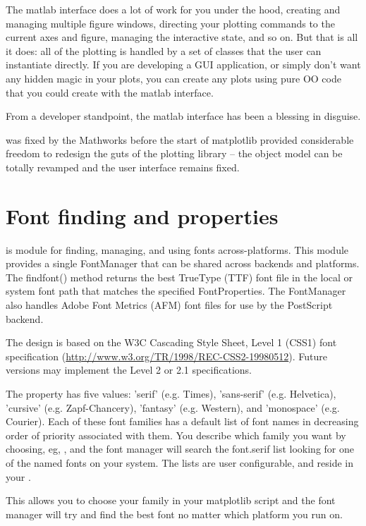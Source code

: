 \documentclass[twoside]{book}
\begin{document}
The matlab interface does a lot of work for you under the hood,
creating and managing multiple figure windows, directing your plotting
commands to the current axes and figure, managing the interactive
state, and so on.  But that is all it does: all of the plotting is
handled by a set of classes that the user can instantiate directly.
If you are developing a GUI application, or simply don't want any
hidden magic in your plots, you can create any plots using pure OO
code that you could create with the matlab interface.

From a developer standpoint, the matlab interface has been a blessing
in disguise.  

was fixed by the Mathworks before the start of matplotlib provided
considerable freedom to redesign the guts of the plotting library --
the object model can be totally revamped and the user interface
remains fixed.


\chapter{Font finding and properties}
\label{cha:font_finding}

 is module for finding,
managing, and using fonts across-platforms.  This module provides a
single FontManager that can be shared across backends and platforms.
The findfont() method returns the best TrueType (TTF) font file in the
local or system font path that matches the specified FontProperties.
The FontManager also handles Adobe Font Metrics (AFM) font files for
use by the PostScript backend.

The design is based on the W3C Cascading Style Sheet, Level 1 (CSS1)
font specification (\url{http://www.w3.org/TR/1998/REC-CSS2-19980512}).
Future versions may implement the Level 2 or 2.1 specifications.
      
The  property has five values: 'serif' (e.g. Times),
'sans-serif' (e.g. Helvetica), 'cursive' (e.g. Zapf-Chancery),
'fantasy' (e.g. Western), and 'monospace' (e.g. Courier).  Each of
these font families has a default list of font names in decreasing
order of priority associated with them.  You describe which family you
want by choosing, eg, , and the font manager will
search the font.serif list looking for one of the named fonts on your
system.  The lists are user configurable, and reside in your
.

This allows you to choose your family in your matplotlib script and
the font manager will try and find the best font no matter which
platform you run on.
\end{document}
